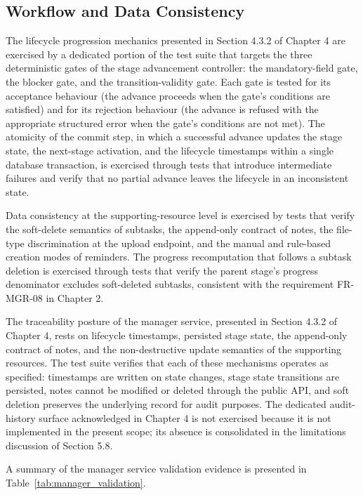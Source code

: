 \subsection{Workflow and Data Consistency}
The lifecycle progression mechanics presented in Section 4.3.2 of Chapter 4 are exercised by a dedicated portion of the test suite that targets the three deterministic gates of the stage advancement controller: the mandatory-field gate, the blocker gate, and the transition-validity gate. Each gate is tested for its acceptance behaviour (the advance proceeds when the gate's conditions are satisfied) and for its rejection behaviour (the advance is refused with the appropriate structured error when the gate's conditions are not met). The atomicity of the commit step, in which a successful advance updates the stage state, the next-stage activation, and the lifecycle timestamps within a single database transaction, is exercised through tests that introduce intermediate failures and verify that no partial advance leaves the lifecycle in an inconsistent state.

Data consistency at the supporting-resource level is exercised by tests that verify the soft-delete semantics of subtasks, the append-only contract of notes, the file-type discrimination at the upload endpoint, and the manual and rule-based creation modes of reminders. The progress recomputation that follows a subtask deletion is exercised through tests that verify the parent stage's progress denominator excludes soft-deleted subtasks, consistent with the requirement FR-MGR-08 in Chapter 2.

The traceability posture of the manager service, presented in Section 4.3.2 of Chapter 4, rests on lifecycle timestamps, persisted stage state, the append-only contract of notes, and the non-destructive update semantics of the supporting resources. The test suite verifies that each of these mechanisms operates as specified: timestamps are written on state changes, stage state transitions are persisted, notes cannot be modified or deleted through the public API, and soft deletion preserves the underlying record for audit purposes. The dedicated audit-history surface acknowledged in Chapter 4 is not exercised because it is not implemented in the present scope; its absence is consolidated in the limitations discussion of Section 5.8.

A summary of the manager service validation evidence is presented in Table~\ref{tab:manager_validation}.


